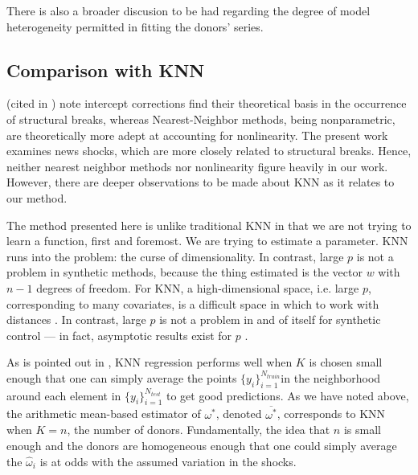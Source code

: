 \documentclass[11pt,3p,review,authoryear]{elsarticle}
\theoremstyle{definition}
\begin{document}
There is also a broader discusion to be had regarding the degree of model heterogeneity permitted in fitting the donors' series.  

\subsection{Comparison with KNN}

\cite{clements1996intercept} (cited in \cite{guerron2017macroeconomic})  note intercept corrections find their theoretical basis in the occurrence of structural breaks, whereas Nearest-Neighbor methods, being nonparametric, are theoretically more adept at accounting for nonlinearity.  The present work examines news shocks, which are more closely related to structural breaks.  Hence, neither nearest neighbor methods nor nonlinearity figure heavily in our work.  However, there are deeper observations to be made about KNN as it relates to our method.

The method presented here is unlike traditional KNN in that we are not trying to learn a function, first and foremost.  We are trying to estimate a parameter.  KNN runs into the problem: the curse of dimensionality.  In contrast, large $p$ is not a problem in synthetic methods, because the thing estimated is the vector $w$ with $n-1$ degrees of freedom.  For KNN, a high-dimensional space, i.e. large $p$, corresponding to many covariates, is a difficult space in which to work with distances \citep{hastie2009elements}.  In contrast, large $p$ is not a problem in and of itself for synthetic control --- in fact, asymptotic results exist for $p$ \citep{abadie2010synthetic}.  

As is pointed out in \citet{hastie2009elements}, KNN regression performs well when $K$ is chosen small enough that one can simply average the points $\{y_{i}\}_{i=1}^{N_{train}}$in the neighborhood around each element in $\{y_{i}\}_{i=1}^{N_{test}}$ to get good predictions.  As we have noted above, the arithmetic mean-based estimator of $\omega^{*}$, denoted $\overline{\omega^{*}}$, corresponds to KNN when $K = n$, the number of donors.  Fundamentally, the idea that $n$ is small enough and the donors are homogeneous enough that one could simply average the $\hat\omega_{i}$ is at odds with the assumed variation in the shocks.
\end{document}
